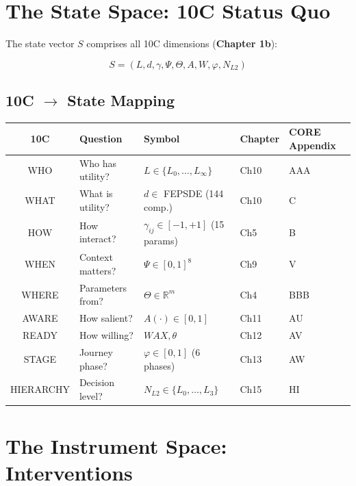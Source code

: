 \section{The State Space: 10C Status Quo}
\label{sec:mp-state}

The state vector $S$ comprises all 10C dimensions (\textbf{Chapter 1b}):

\begin{equation}
\boxed{
S = (L, d, \gamma, \Psi, \Theta, A, W, \varphi, N_{L2})
}
\label{eq:mp-state-vector}
\end{equation}

\subsection{10C $\to$ State Mapping}

\begin{center}
\renewcommand{\arraystretch}{1.3}
\begin{tabular}{cllll}
\toprule
\textbf{10C} & \textbf{Question} & \textbf{Symbol} & \textbf{Chapter} & \textbf{CORE Appendix} \\
\midrule
WHO & Who has utility? & $L \in \{L_0, \ldots, L_\infty\}$ & Ch10 & AAA \\
WHAT & What is utility? & $d \in$ FEPSDE (144 comp.) & Ch10 & C \\
HOW & How interact? & $\gamma_{ij} \in [-1, +1]$ (15 params) & Ch5 & B \\
WHEN & Context matters? & $\Psi \in [0,1]^8$ & Ch9 & V \\
WHERE & Parameters from? & $\Theta \in \mathbb{R}^m$ & Ch4 & BBB \\
AWARE & How salient? & $A(\cdot) \in [0,1]$ & Ch11 & AU \\
READY & How willing? & $WAX, \theta$ & Ch12 & AV \\
STAGE & Journey phase? & $\varphi \in [0,1]$ (6 phases) & Ch13 & AW \\
HIERARCHY & Decision level? & $N_{L2} \in \{L_0, \ldots, L_3\}$ & Ch15 & HI \\
\bottomrule
\end{tabular}
\end{center}

\section{The Instrument Space: Interventions}
\label{sec:mp-instruments}

